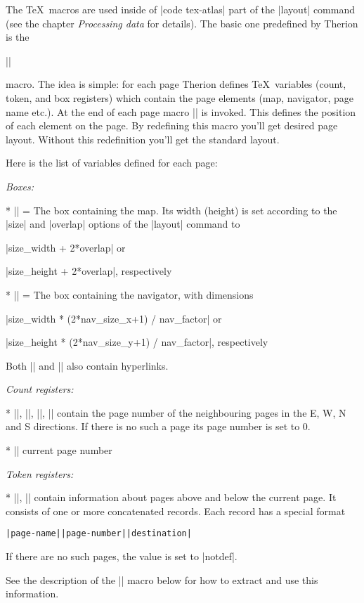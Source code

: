 The \TeX\ macros are used inside of |code tex-atlas| part of the |layout| command (see the chapter {\it Processing data} for details). The basic one predefined by Therion is the 

|\dopage| 

macro. The idea is simple: for each page Therion defines \TeX\ variables (count, token, and box registers) which contain the page elements (map, navigator, page name etc.). At the end of each page macro |\dopage| is invoked. This defines the position of each element on the page. By redefining this macro you'll get desired page layout. Without this redefinition you'll get the standard layout. 

Here is the list of variables defined for each page: 

\list

{\it Boxes:} 

* |\mapbox| = The box containing the map. Its width (height) is set according to the |size| and |overlap| options of the |layout| command to 

|size_width + 2*overlap| or 

|size_height + 2*overlap|, respectively 

* |\navbox| = The box containing the navigator, with dimensions 

|size_width * (2*nav_size_x+1) / nav_factor| or 

|size_height * (2*nav_size_y+1) / nav_factor|, respectively 

Both |\mapbox| and |\navbox| also contain hyperlinks. 

{\it Count registers:} 

* |\pointerE|, |\pointerW|, |\pointerN|, |\pointerS| contain the page number of the neighbouring pages in the E, W, N and S directions. If there is no such a page its page number is set to 0. 

* |\pagenum| current page number 

{\it Token registers:} 

* |\pointerU|, |\pointerD| contain information about pages above and below the current page. It consists of one or more concatenated records. Each record has a special format 

{\tt|page-name||page-number||destination|} 

If there are no such pages, the value is set to |notdef|. 

See the description of the |\processpointeritem| macro below for how to extract and use this information. 

